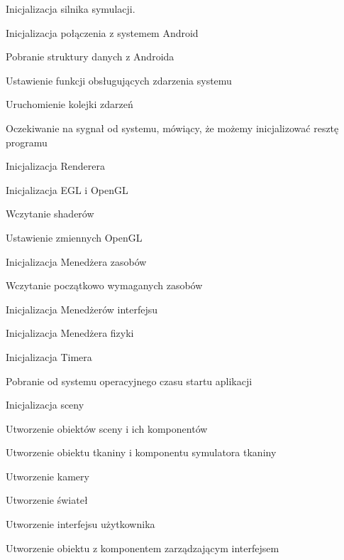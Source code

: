 	\begin{algorithm}
		\label{alg_4_1}
		\caption{Inicjalizacja silnika symulacji.}
			
				Inicjalizacja połączenia z systemem Android
				
				\Indp
				
					Pobranie struktury danych z Androida
					
					Ustawienie funkcji obsługujących zdarzenia systemu
					
					Uruchomienie kolejki zdarzeń
					
					Oczekiwanie na sygnał od systemu, mówiący, że możemy inicjalizować resztę programu
				
				\Indm
									
				Inicjalizacja Renderera
				
				\Indp
				
					Inicjalizacja EGL i OpenGL
					
					Wczytanie shaderów
					
					Ustawienie zmiennych OpenGL
					
				\Indm	
				
				Inicjalizacja Menedżera zasobów
				
				\Indp
					
					Wczytanie początkowo wymaganych zasobów
				
				\Indm	
				
				Inicjalizacja Menedżerów interfejsu
				
				Inicjalizacja Menedżera fizyki
				
				Inicjalizacja Timera
				
				\Indp
				
					Pobranie od systemu operacyjnego czasu startu aplikacji
				
				\Indm
				
				Inicjalizacja sceny
				
				\Indp
				
					Utworzenie obiektów sceny i ich komponentów
					
					Utworzenie obiektu tkaniny i komponentu symulatora tkaniny
					
					Utworzenie kamery
					
					Utworzenie świateł
					
					Utworzenie interfejsu użytkownika
					
					Utworzenie obiektu z komponentem zarządzającym interfejsem
				
				\Indm			
	\end{algorithm}
	
